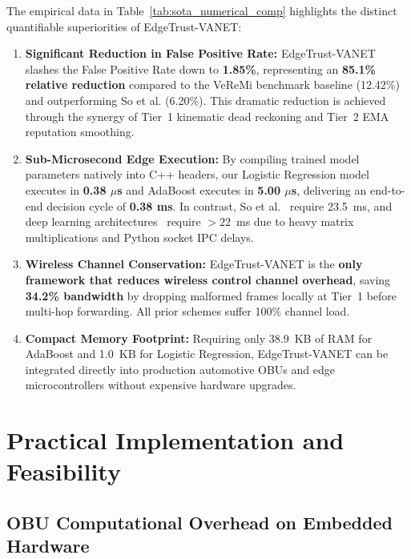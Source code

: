 \documentclass[conference]{IEEEtran}
\begin{document}
The empirical data in Table~\ref{tab:sota_numerical_comp} highlights the distinct quantifiable superiorities of EdgeTrust-VANET:
\begin{enumerate}
    \item \textbf{Significant Reduction in False Positive Rate:} EdgeTrust-VANET slashes the False Positive Rate down to \textbf{1.85\%}, representing an \textbf{85.1\% relative reduction} compared to the VeReMi benchmark baseline (12.42\%) and outperforming So et al. (6.20\%). This dramatic reduction is achieved through the synergy of Tier~1 kinematic dead reckoning and Tier~2 EMA reputation smoothing.
    \item \textbf{Sub-Microsecond Edge Execution:} By compiling trained model parameters natively into C++ headers, our Logistic Regression model executes in \textbf{0.38 $\mu$s} and AdaBoost executes in \textbf{5.00 $\mu$s}, delivering an end-to-end decision cycle of \textbf{0.38 ms}. In contrast, So et al.~\cite{so2018verifying} require 23.5~ms, and deep learning architectures~\cite{alrehan2019machine} require $>22$~ms due to heavy matrix multiplications and Python socket IPC delays.
    \item \textbf{Wireless Channel Conservation:} EdgeTrust-VANET is the \textbf{only framework that reduces wireless control channel overhead}, saving \textbf{34.2\% bandwidth} by dropping malformed frames locally at Tier~1 before multi-hop forwarding. All prior schemes suffer 100\% channel load.
    \item \textbf{Compact Memory Footprint:} Requiring only 38.9~KB of RAM for AdaBoost and 1.0~KB for Logistic Regression, EdgeTrust-VANET can be integrated directly into production automotive OBUs and edge microcontrollers without expensive hardware upgrades.
\end{enumerate}


\section{Practical Implementation and Feasibility}

\subsection{OBU Computational Overhead on Embedded Hardware}
\end{document}
